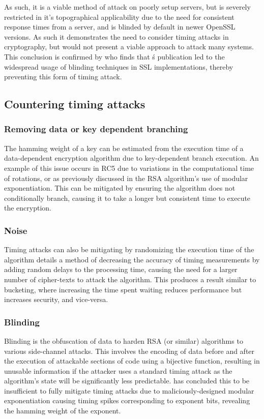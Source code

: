 \documentclass[british,10pt,a4paper]{article}
\begin{document}
As such, it is a viable method of attack on poorly setup servers, but is severely restricted in it's topographical applicability due to the need for consistent response times from a server, and is blinded by default in newer OpenSSL versions. As such it demonstrates the need to consider timing attacks in cryptography, but would not present a viable approach to attack many systems. This conclusion is confirmed by \citet{wong} who finds that \citeauthor{Brumley2005-ez}\'s publication led to the widespread usage of blinding techniques in SSL implementations, thereby preventing this form of timing attack.


\subsection{Countering timing attacks}

\subsubsection{Removing data or key dependent branching}
The hamming weight of a key can be estimated from the execution time of a data-dependent encryption algorithm due to key-dependent branch execution. An example of this issue occurs in RC5 \cite{Handschuh1999} due to variations in the computational time of rotations, or as previously discussed in the RSA algorithm's use of modular exponentiation.
This can be mitigated by ensuring the algorithm does not conditionally branch, causing it to take a longer but consistent time to execute the encryption.

\subsubsection{Noise}
Timing attacks can also be mitigating by randomizing the execution time of the algorithm \citet{kocher96timing} details a method of decreasing the accuracy of timing measurements by adding random delays to the processing time, causing the need for a larger number of cipher-texts to attack the algorithm. This produces a result similar to bucketing, where increasing the time spent waiting reduces performance but increases security, and vice-versa.

\subsubsection{Blinding}
Blinding is the obfuscation of data to harden RSA (or similar) algorithms to various side-channel attacks. This involves the encoding of data before and after the execution of attackable sections of code using a bijective function,
resulting in unusable information if the attacker uses a standard timing attack as the algorithm's state will be significantly less predictable. \citet{kocher96timing} has concluded this to be insufficient to fully mitigate timing attacks due to maliciously-designed modular exponentiation causing timing spikes corresponding to exponent bits, revealing the hamming weight of the exponent.
\end{document}
